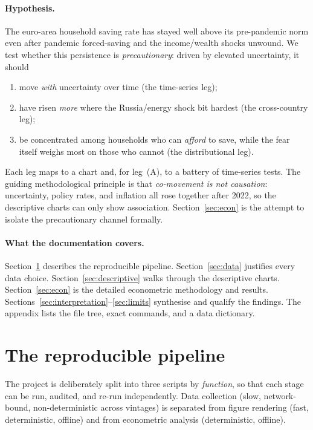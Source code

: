 \documentclass[11pt,a4paper]{article}
\begin{document}
\paragraph{Hypothesis.} The euro-area household saving rate has stayed well above
its pre-pandemic norm even after pandemic forced-saving and the income/wealth
shocks unwound. We test whether this persistence is \emph{precautionary}: driven
by elevated uncertainty, it should
\begin{enumerate}[label=(\Alph*)]
  \item move \emph{with} uncertainty over time (the time-series leg);
  \item have risen \emph{more} where the Russia/energy shock bit hardest (the
        cross-country leg);
  \item be concentrated among households who can \emph{afford} to save, while the
        fear itself weighs most on those who cannot (the distributional leg).
\end{enumerate}
Each leg maps to a chart and, for leg~(A), to a battery of time-series tests.
The guiding methodological principle is that \emph{co-movement is not
causation}: uncertainty, policy rates, and inflation all rose together after
2022, so the descriptive charts can only show association. Section~\ref{sec:econ}
is the attempt to isolate the precautionary channel formally.

\paragraph{What the documentation covers.} Section~\ref{sec:pipeline} describes
the reproducible pipeline. Section~\ref{sec:data} justifies every data choice.
Section~\ref{sec:descriptive} walks through the descriptive charts.
Section~\ref{sec:econ} is the detailed econometric methodology and results.
Sections~\ref{sec:interpretation}--\ref{sec:limits} synthesise and qualify the
findings. The appendix lists the file tree, exact commands, and a data
dictionary.

\section{The reproducible pipeline}\label{sec:pipeline}

The project is deliberately split into three scripts by \emph{function}, so that
each stage can be run, audited, and re-run independently. Data collection (slow,
network-bound, non-deterministic across vintages) is separated from figure
rendering (fast, deterministic, offline) and from econometric analysis
(deterministic, offline).
\end{document}
